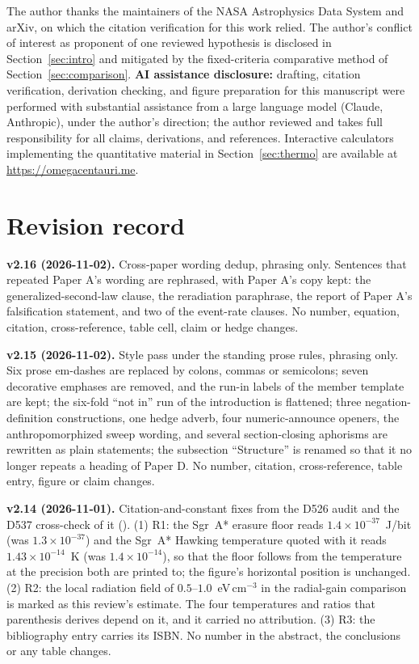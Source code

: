 \documentclass[11pt]{article}
\begin{document}
The author thanks the maintainers of the NASA Astrophysics Data System and arXiv, on which the citation verification for this work relied. The author's conflict of interest as proponent of one reviewed hypothesis is disclosed in Section~\ref{sec:intro} and mitigated by the fixed-criteria comparative method of Section~\ref{sec:comparison}. \textbf{AI assistance disclosure:} drafting, citation verification, derivation checking, and figure preparation for this manuscript were performed with substantial assistance from a large language model (Claude, Anthropic), under the author's direction; the author reviewed and takes full responsibility for all claims, derivations, and references. Interactive calculators implementing the quantitative material in Section~\ref{sec:thermo} are available at \url{https://omegacentauri.me}.

\section*{Revision record}

\textbf{v2.16 (2026-11-02).} Cross-paper wording dedup, phrasing only. Sentences that repeated Paper A's wording are rephrased, with Paper A's copy kept: the generalized-second-law clause, the \citet{Curtis2026DysonMinds} reradiation paraphrase, the report of Paper A's falsification statement, and two of the event-rate clauses. No number, equation, citation, cross-reference, table cell, claim or hedge changes.

\textbf{v2.15 (2026-11-02).} Style pass under the standing prose rules, phrasing only. Six prose em-dashes are replaced by colons, commas or semicolons; seven decorative emphases are removed, and the run-in labels of the member template are kept; the six-fold ``not in'' run of the introduction is flattened; three negation-definition constructions, one hedge adverb, four numeric-announce openers, the anthropomorphized sweep wording, and several section-closing aphorisms are rewritten as plain statements; the subsection ``Structure'' is renamed so that it no longer repeats a heading of Paper D. No number, citation, cross-reference, table entry, figure or claim changes.

\textbf{v2.14 (2026-11-01).} Citation-and-constant fixes from the D526 audit and the D537 cross-check of it (). (1) R1: the Sgr~A* erasure floor reads $1.4\times10^{-37}$~J/bit (was $1.3\times10^{-37}$) and the Sgr~A* Hawking temperature quoted with it reads $1.43\times10^{-14}$~K (was $1.4\times10^{-14}$), so that the floor follows from the temperature at the precision both are printed to; the figure's horizontal position is unchanged. (2) R2: the local radiation field of $0.5$--$1.0$~eV\,cm$^{-3}$ in the radial-gain comparison is marked as this review's estimate. The four temperatures and ratios that parenthesis derives depend on it, and it carried no attribution. (3) R3: the \citet{MTW1973} bibliography entry carries its ISBN. No number in the abstract, the conclusions or any table changes.
\end{document}
